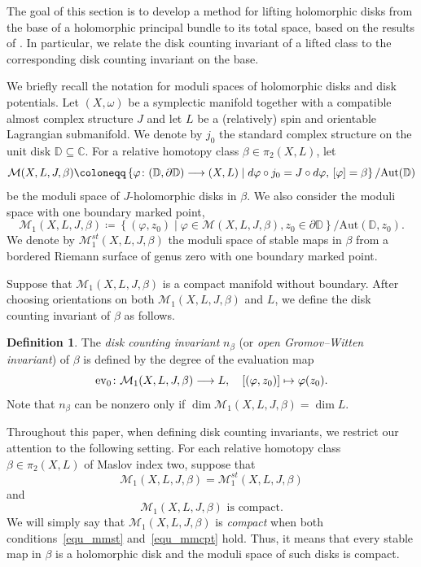 \documentclass[11pt]{amsart}
\theoremstyle{plain}
\theoremstyle{definition}
\newtheorem{definition}[theorem]{Definition}
\theoremstyle{remark}
\newcommand{\C}{\mathbb{C}}
\def\mcal{\mathcal}
\numberwithin{equation}{section} \numberwithin{table}{section}
\def\to{\mathchoice{\longrightarrow}{\rightarrow}{\rightarrow}{\rightarrow}}
\numberwithin{equation}{section}
\begin{document}
The goal of this section is to develop a method for lifting holomorphic disks from the base of a holomorphic principal bundle to its total space, based on the results of \cite{Kim26}. In particular, we relate the disk counting invariant of a lifted class to the corresponding disk counting invariant on the base.

We briefly recall the notation for moduli spaces of holomorphic disks and disk potentials. Let $(X,\omega)$ be a symplectic manifold together with a compatible almost complex structure $J$ and let $L$ be a (relatively) spin and orientable Lagrangian submanifold. We denote by $j_0$ the standard complex structure on the unit disk $\mathbb{D} \subseteq \C$. For a relative homotopy class $\beta \in \pi_2(X, L)$, let 
$$
\mathcal{M}(X,L,J,\beta) \coloneqq \left\{ \varphi \colon (\mathbb{D}, \partial \mathbb{D}) \to (X,L) \mid d \varphi \circ j_0 = J \circ d \varphi, \, [\varphi] = \beta \right\} / \mathrm{Aut}(\mathbb{D})
$$
be the moduli space of $J$-holomorphic disks in $\beta$. We also consider the moduli space with one boundary marked point,
$$
\mathcal{M}_1(X,L,J,\beta) \coloneqq \left\{ \left( \varphi, z_0 \right) \mid \varphi \in {\mathcal{M}}(X,L,J,\beta), z_0 \in \partial \mathbb{D}  \right\} / \mathrm{Aut}(\mathbb{D}, z_0).
$$
We denote by $\mathcal{M}^{st}_1(X,L,J,\beta)$ the moduli space of stable maps in $\beta$ from a bordered Riemann surface of genus zero with one boundary marked point. 

Suppose that $\mathcal{M}_1(X,L,J,\beta)$ is a compact manifold without boundary. After choosing orientations on both $\mathcal{M}_1(X,L,J,\beta)$ and $L$, we define the disk counting invariant of $\beta$ as follows.

\begin{definition}\label{def_diskcountinginv}
The \emph{disk counting invariant} $n_\beta$ (or \emph{open Gromov--Witten invariant}) of $\beta$ is defined by the degree of the evaluation map
\begin{equation}\label{equ_degreeev}
\mathrm{ev}_0 \colon \mcal{M}_1(X,L,J,\beta) \to L, \quad [(\varphi, z_0)] \mapsto \varphi(z_0).
\end{equation}
Note that $n_\beta$ can be nonzero only if $\dim \mcal{M}_1(X,L,J,\beta) = \dim L$. 
\end{definition}

Throughout this paper, when defining disk counting invariants, we restrict our attention to the following setting. For each relative homotopy class $\beta \in \pi_2(X, L)$ of Maslov index two, suppose that
\begin{equation}\label{equ_mmst}
\mathcal{M}_1(X, L, J, \beta) = \mathcal{M}^{st}_1(X, L, J, \beta)
\end{equation} 
and
\begin{equation}\label{equ_mmcpt}
\mathcal{M}_1(X, L, J, \beta) \mbox{ is compact.} 
\end{equation}
We will simply say that $\mathcal{M}_1(X,L,J,\beta)$ is \emph{compact} when both conditions~\eqref{equ_mmst} and~\eqref{equ_mmcpt} hold. Thus, it means that every stable map in $\beta$ is a holomorphic disk and the moduli space of such disks is compact.
\end{document}
